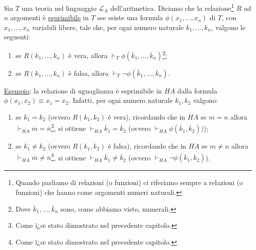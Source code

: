 \begin{defi}
Sia $T$ una teoria nel linguaggio $\mathcal{L}_{A}$ dell'aritmetica. Diciamo che la relazione\footnote{Quando parliamo di relazioni (o funzioni) ci riferiamo sempre a relazioni (o funzioni) che hanno come argomenti numeri naturali.} $R$ ad $n$ argomenti \`e \underline{esprimibile} in $T$ sse esiste una formula $\phi(x_{1},\ldots,x_{n})$ di $T$, con $x_{1}, \ldots, x_{n}$ variabili libere, tale che, per ogni numero naturale $k_{1}, \ldots,k_{n}$, valgono le seguenti:
\begin{enumerate}
  \item se $R(k_{1}, \ldots,k_{n})$ \`e vera, allora $\vdash_{T} \phi(\overline{k}_{1}, \ldots, \overline{k}_{n})$\footnote{Dove $\overline{k}_{1}, \ldots,\overline{k}_{n}$ sono, come abbiamo visto, numerali.};
  \item se $R(k_{1}, \ldots,k_{n})$ \`e falsa, allora $\vdash_{T} \neg \phi(\overline{k}_{1}, \ldots, \overline{k}_{n})$.
\end{enumerate}
\end{defi}
\vspace{0.1cm}
\underline{Esempio}: la relazione di uguaglianza \`e esprimibile in $HA$ dalla formula $\phi(x_{1},x_{2})\equiv x_{1}=x_{2}$. Infatti, per ogni numero naturale $k_{1}, k_{2}$ valgono:\\
 \begin{enumerate}
  \item se $k_{1}=k_{2}$ (ovvero $R(k_{1},k_{2})$ \'e vera), ricordando che in $HA$ se $m=n$ allora $\vdash_{HA} \overline{m}=\overline{n}$\footnote{Come ï¿œ stato dimostrato nel precedente capitolo.}, si ottiene $\vdash_{HA} \overline{k}_{1}=\overline{k}_{2}$ (ovvero $\vdash_{HA}\phi(\overline{k}_{1},\overline{k}_{2}))$);
  \item se $k_{1}\neq k_{2}$ (ovvero $R(k_{1},k_{2})$ \'e falsa), ricordando che in $HA$ se $m\neq n$ allora $\vdash_{HA} \overline{m}\neq \overline{n}$\footnote{Come ï¿œ stato dimostrato nel precedente capitolo.}, si ottiene $\vdash_{HA} \overline{k}_{1}\neq \overline{k}_{2}$ (ovvero $\vdash_{HA} \neg \phi(\overline{k}_{1},\overline{k}_{2})$).
\end{enumerate}
\vspace{0.5cm}

